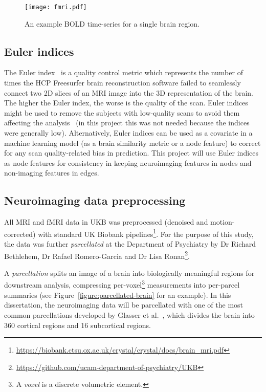 \begin{figure}[]
    \centering
    \texttt{[image: fmri.pdf]}
    \caption{An example BOLD time-series for a single brain region.}\label{figure:fmri}
\end{figure}

\subsection{Euler indices}
The Euler index~\cite{rosen2018quantitative} is a quality control metric which represents the number of times the HCP Freesurfer brain reconstruction software failed to seamlessly connect two 2D slices of an MRI image into the 3D representation of the brain. The higher the Euler index, the worse is the quality of the scan. Euler indices might be used to remove the subjects with low-quality scans to avoid them affecting the analysis~\cite{kaufmann2019} (in this project this was not needed because the indices were generally low). Alternatively, Euler indices can be used as a covariate in a machine learning model (as a brain similarity metric or a node feature) to correct for any scan quality-related bias in prediction. This project will use Euler indices as node features for consistency in keeping neuroimaging features in nodes and non-imaging features in edges.


\subsection{Neuroimaging data preprocessing}

All MRI and fMRI data in UKB was preprocessed (denoised and motion-corrected) with standard UK Biobank pipelines\footnote{\url{https://biobank.ctsu.ox.ac.uk/crystal/crystal/docs/brain_mri.pdf}}. For the purpose of this study, the data was further \textit{parcellated} at the Department of Psychiatry by Dr Richard Bethlehem, Dr Rafael Romero-Garcia and Dr Lisa Ronan\footnote{\url{https://github.com/ucam-department-of-psychiatry/UKB}}.

A \textit{parcellation} splits an image of a brain into biologically meaningful regions for downstream analysis, compressing per-voxel\footnote{A \textit{voxel} is a discrete volumetric element.} measurements into per-parcel summaries (see Figure~\ref{figure:parcellated-brain} for an example). In this dissertation, the neuroimaging data will be parcellated with one of the most common parcellations developed by Glasser et al.~\cite{glasser2016multi}, which divides the brain into 360 cortical regions and 16 subcortical regions. 


